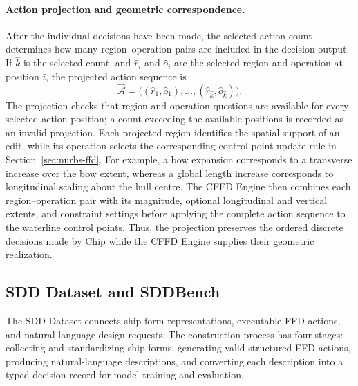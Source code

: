 \documentclass[a4paper,fleqn]{cas-dc}
\begin{document}
\paragraph{Action projection and geometric correspondence.}
After the individual decisions have been made, the selected action count
determines how many region--operation pairs are included in the decision output.
If $\hat{k}$ is the selected count, and $\hat{r}_i$ and $\hat{o}_i$ are the
selected region and operation at position $i$, the projected action sequence is
\begin{equation}
 \hat{\mathcal{A}}=
 \bigl((\hat{r}_1,\hat{o}_1),\ldots,
       (\hat{r}_{\hat{k}},\hat{o}_{\hat{k}})\bigr).
 \label{eq:action-projection}
\end{equation}
The projection checks that region and operation questions are available for every
selected action position; a count exceeding the available positions is recorded
as an invalid projection. Each projected region identifies the spatial support of
an edit, while its operation selects the corresponding control-point update rule
in Section~\ref{sec:nurbs-ffd}. For example, a bow expansion corresponds to a
transverse increase over the bow extent, whereas a global length increase
corresponds to longitudinal scaling about the hull centre. The CFFD Engine then
combines each region--operation pair with its magnitude, optional longitudinal
and vertical extents, and constraint settings before applying the complete action
sequence to the waterline control points. Thus, the projection preserves the
ordered discrete decisions made by Chip while the CFFD Engine supplies their
geometric realization.

\subsection{SDD Dataset and SDDBench}
\label{sec:dataset-benchmark}

The SDD Dataset connects ship-form representations, executable FFD actions, and
natural-language design requests. The construction process has four stages:
collecting and standardizing ship forms, generating valid structured FFD actions,
producing natural-language descriptions, and converting each description into a
typed decision record for model training and evaluation.
\end{document}
